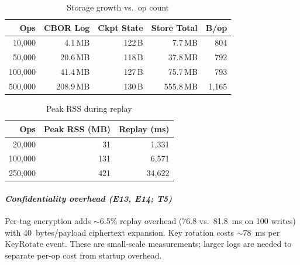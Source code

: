\documentclass[10pt,journal,compsoc]{IEEEtran}
\begin{document}
\begin{table}[!htbp]
\centering
\caption{Storage growth vs.\ op count}
\label{tab:e8-storage}
\begin{tabular}{@{}rrrrr@{}}
\toprule
\textbf{Ops} & \textbf{CBOR Log} & \textbf{Ckpt State} & \textbf{Store Total} & \textbf{B/op} \\
\midrule
10,000  & 4.1\,MB   & 122\,B & 7.7\,MB   & 804 \\
50,000  & 20.6\,MB  & 118\,B & 37.8\,MB  & 792 \\
100,000 & 41.4\,MB  & 127\,B & 75.7\,MB  & 793 \\
500,000 & 208.9\,MB & 130\,B & 555.8\,MB & 1,165 \\
\bottomrule
\end{tabular}
\end{table}

\begin{table}[!htbp]
\centering
\caption{Peak RSS during replay}
\label{tab:e9-memory}
\begin{tabular}{@{}rrr@{}}
\toprule
\textbf{Ops} & \textbf{Peak RSS (MB)} & \textbf{Replay (ms)} \\
\midrule
20,000  & 31   & 1,331  \\
100,000 & 131  & 6,571  \\
250,000 & 421  & 34,622 \\
\bottomrule
\end{tabular}
\end{table}

\paragraph*{\textbf{\textit{Confidentiality overhead (E13, E14; T5)}}}
Per-tag encryption adds $\sim$6.5\% replay overhead (76.8 vs.\ 81.8~ms on 100 writes) with 40~bytes/payload ciphertext expansion. Key rotation costs $\sim$78~ms per KeyRotate event. These are small-scale measurements; larger logs are needed to separate per-op cost from startup overhead.
\end{document}
